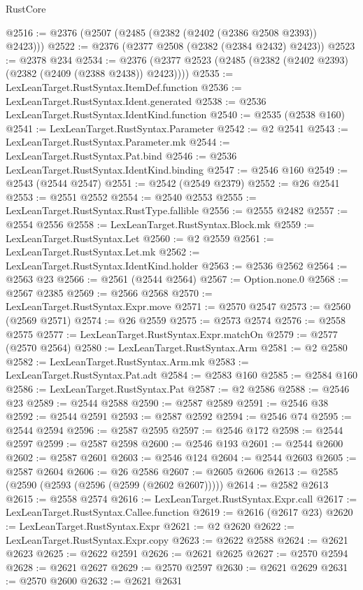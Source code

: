\begin{lexlean}{RustCore}
\begin{coremodule}
@2516 := @2376 (@2507 (@2485 (@2382 (@2402 (@2386 @2508 @2393)) @2423)))
@2522 := @2376 (@2377 @2508 (@2382 (@2384 @2432) @2423))
@2523 := @2378 @234
@2534 := @2376 (@2377 @2523 (@2485 (@2382 (@2402 @2393) (@2382 (@2409 (@2388 @2438)) @2423))))
@2535 := LexLeanTarget.RustSyntax.ItemDef.function
@2536 := LexLeanTarget.RustSyntax.Ident.generated
@2538 := @2536 LexLeanTarget.RustSyntax.IdentKind.function
@2540 := @2535 (@2538 @160)
@2541 := LexLeanTarget.RustSyntax.Parameter
@2542 := @2 @2541
@2543 := LexLeanTarget.RustSyntax.Parameter.mk
@2544 := LexLeanTarget.RustSyntax.Pat.bind
@2546 := @2536 LexLeanTarget.RustSyntax.IdentKind.binding
@2547 := @2546 @160
@2549 := @2543 (@2544 @2547)
@2551 := @2542 (@2549 @2379)
@2552 := @26 @2541
@2553 := @2551 @2552
@2554 := @2540 @2553
@2555 := LexLeanTarget.RustSyntax.RustType.fallible
@2556 := @2555 @2482
@2557 := @2554 @2556
@2558 := LexLeanTarget.RustSyntax.Block.mk
@2559 := LexLeanTarget.RustSyntax.Let
@2560 := @2 @2559
@2561 := LexLeanTarget.RustSyntax.Let.mk
@2562 := LexLeanTarget.RustSyntax.IdentKind.holder
@2563 := @2536 @2562
@2564 := @2563 @23
@2566 := @2561 (@2544 @2564)
@2567 := Option.none.{0}
@2568 := @2567 @2385
@2569 := @2566 @2568
@2570 := LexLeanTarget.RustSyntax.Expr.move
@2571 := @2570 @2547
@2573 := @2560 (@2569 @2571)
@2574 := @26 @2559
@2575 := @2573 @2574
@2576 := @2558 @2575
@2577 := LexLeanTarget.RustSyntax.Expr.matchOn
@2579 := @2577 (@2570 @2564)
@2580 := LexLeanTarget.RustSyntax.Arm
@2581 := @2 @2580
@2582 := LexLeanTarget.RustSyntax.Arm.mk
@2583 := LexLeanTarget.RustSyntax.Pat.adt
@2584 := @2583 @160
@2585 := @2584 @160
@2586 := LexLeanTarget.RustSyntax.Pat
@2587 := @2 @2586
@2588 := @2546 @23
@2589 := @2544 @2588
@2590 := @2587 @2589
@2591 := @2546 @38
@2592 := @2544 @2591
@2593 := @2587 @2592
@2594 := @2546 @74
@2595 := @2544 @2594
@2596 := @2587 @2595
@2597 := @2546 @172
@2598 := @2544 @2597
@2599 := @2587 @2598
@2600 := @2546 @193
@2601 := @2544 @2600
@2602 := @2587 @2601
@2603 := @2546 @124
@2604 := @2544 @2603
@2605 := @2587 @2604
@2606 := @26 @2586
@2607 := @2605 @2606
@2613 := @2585 (@2590 (@2593 (@2596 (@2599 (@2602 @2607)))))
@2614 := @2582 @2613
@2615 := @2558 @2574
@2616 := LexLeanTarget.RustSyntax.Expr.call
@2617 := LexLeanTarget.RustSyntax.Callee.function
@2619 := @2616 (@2617 @23)
@2620 := LexLeanTarget.RustSyntax.Expr
@2621 := @2 @2620
@2622 := LexLeanTarget.RustSyntax.Expr.copy
@2623 := @2622 @2588
@2624 := @2621 @2623
@2625 := @2622 @2591
@2626 := @2621 @2625
@2627 := @2570 @2594
@2628 := @2621 @2627
@2629 := @2570 @2597
@2630 := @2621 @2629
@2631 := @2570 @2600
@2632 := @2621 @2631

\end{coremodule}
\end{lexlean}
